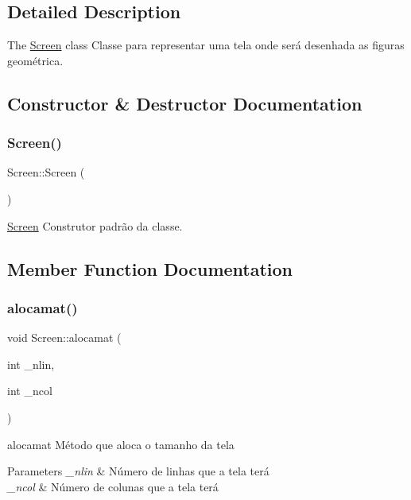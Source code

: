 \subsection{Detailed Description}
The \mbox{\hyperlink{class_screen}{Screen}} class Classe para representar uma tela onde será desenhada as figuras geométrica. 

\subsection{Constructor \& Destructor Documentation}
\mbox{\label{class_screen_ae7576476fc6e6a6eaa66389fdc41fe72}} 
\subsubsection{\texorpdfstring{Screen()}{Screen()}}
{\footnotesize\ttfamily Screen\+::\+Screen (\begin{DoxyParamCaption}{ }\end{DoxyParamCaption})}



\mbox{\hyperlink{class_screen}{Screen}} Construtor padrão da classe. 



\subsection{Member Function Documentation}
\mbox{\label{class_screen_a3570e45d7dbc261cc4da471259a66d7a}} 
\subsubsection{\texorpdfstring{alocamat()}{alocamat()}}
{\footnotesize\ttfamily void Screen\+::alocamat (\begin{DoxyParamCaption}\item[{int}]{\+\_\+nlin,  }\item[{int}]{\+\_\+ncol }\end{DoxyParamCaption})}



alocamat Método que aloca o tamanho da tela 


\begin{DoxyParams}{Parameters}
{\em \+\_\+nlin} & Número de linhas que a tela terá \\
\hline
{\em \+\_\+ncol} & Número de colunas que a tela terá \\
\hline
\end{DoxyParams}
\mbox{\label{class_screen_a35e74266b2a04e37b354ceff7a5f1031}} 

